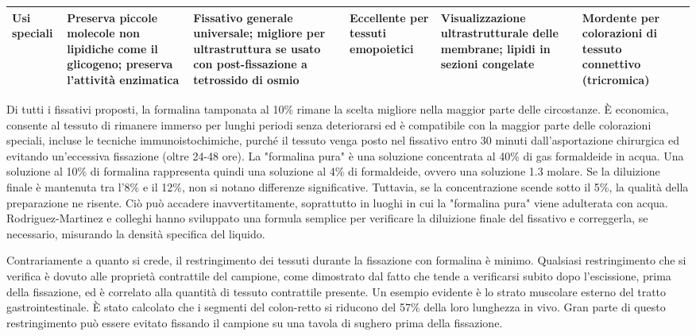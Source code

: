 \begin{longtable}{|p{3.5cm}|p{3cm}|p{3.5cm}|p{3cm}|p{3cm}|p{3.5cm}|}
\textbf{Usi speciali} & Preserva piccole molecole non lipidiche come il glicogeno; preserva l'attività enzimatica & Fissativo generale universale; migliore per ultrastruttura se usato con post-fissazione a tetrossido di osmio & Eccellente per tessuti emopoietici & Visualizzazione ultrastrutturale delle membrane; lipidi in sezioni congelate & Mordente per colorazioni di tessuto connettivo (tricromica) \\ \hline
\end{longtable}

Di tutti i fissativi proposti, la formalina tamponata al 10\% rimane la scelta migliore nella maggior parte delle circostanze. È economica, consente al tessuto di rimanere immerso per lunghi periodi senza deteriorarsi ed è compatibile con la maggior parte delle colorazioni speciali, incluse le tecniche immunoistochimiche, purché il tessuto venga posto nel fissativo entro 30 minuti dall'asportazione chirurgica ed evitando un’eccessiva fissazione (oltre 24-48 ore). La "formalina pura" è una soluzione concentrata al 40\% di gas formaldeide in acqua. Una soluzione al 10\% di formalina rappresenta quindi una soluzione al 4\% di formaldeide, ovvero una soluzione 1.3 molare. Se la diluizione finale è mantenuta tra l'8\% e il 12\%, non si notano differenze significative. Tuttavia, se la concentrazione scende sotto il 5\%, la qualità della preparazione ne risente. Ciò può accadere inavvertitamente, soprattutto in luoghi in cui la "formalina pura" viene adulterata con acqua. Rodriguez-Martinez e colleghi hanno sviluppato una formula semplice per verificare la diluizione finale del fissativo e correggerla, se necessario, misurando la densità specifica del liquido.

Contrariamente a quanto si crede, il restringimento dei tessuti durante la fissazione con formalina è minimo. Qualsiasi restringimento che si verifica è dovuto alle proprietà contrattile del campione, come dimostrato dal fatto che tende a verificarsi subito dopo l'escissione, prima della fissazione, ed è correlato alla quantità di tessuto contrattile presente. Un esempio evidente è lo strato muscolare esterno del tratto gastrointestinale. È stato calcolato che i segmenti del colon-retto si riducono del 57\% della loro lunghezza in vivo. Gran parte di questo restringimento può essere evitato fissando il campione su una tavola di sughero prima della fissazione.

